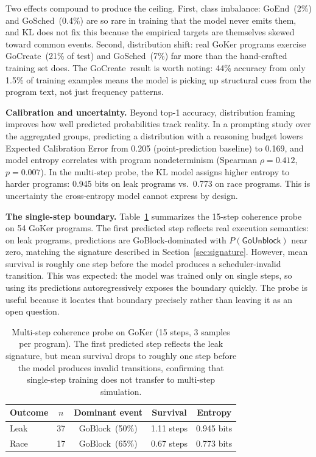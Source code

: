 \documentclass{svproc}
\newcommand{\pblock}{\textsf{GoBlock}}
\newcommand{\punblock}{\textsf{GoUnblock}}
\newcommand{\pcreate}{\textsf{GoCreate}}
\newcommand{\pend}{\textsf{GoEnd}}
\newcommand{\psched}{\textsf{GoSched}}
\begin{document}
Two effects compound to produce the ceiling. First, class imbalance:
\pend\ (2\%) and \psched\ (0.4\%) are so rare in training that the model
never emits them, and KL does not fix this because the empirical targets
are themselves skewed toward common events. Second, distribution shift:
real GoKer programs exercise \pcreate\ (21\% of test) and \psched\ (7\%)
far more than the hand-crafted training set does. The \pcreate\ result
is worth noting: 44\% accuracy from only 1.5\% of training examples
means the model is picking up structural cues from the program text, not
just frequency patterns.

\textbf{Calibration and uncertainty.}
Beyond top-1 accuracy, distribution framing improves how well predicted
probabilities track reality. In a prompting study over the aggregated
groups, predicting a distribution with a reasoning budget lowers Expected
Calibration Error from 0.205 (point-prediction baseline) to 0.169, and
model entropy correlates with program nondeterminism (Spearman
$\rho=0.412$, $p=0.007$). In the multi-step probe, the KL model assigns
higher entropy to harder programs: 0.945 bits on leak programs vs.\
0.773 on race programs. This is uncertainty the cross-entropy model
cannot express by design.

\textbf{The single-step boundary.}
Table~\ref{tab:rollout} summarizes the 15-step coherence probe on 54
GoKer programs. The first predicted step reflects real execution
semantics: on leak programs, predictions are \pblock-dominated with
$P(\punblock)$ near zero, matching the signature described in
Section~\ref{sec:signature}. However, mean survival is roughly one step
before the model produces a scheduler-invalid transition. This was
expected: the model was trained only on single steps, so using its
predictions autoregressively exposes the boundary quickly. The probe is
useful because it locates that boundary precisely rather than leaving it
as an open question.

\begin{table}[t]
\centering
\caption{Multi-step coherence probe on GoKer (15 steps, 3 samples per
program). The first predicted step reflects the leak signature, but
mean survival drops to roughly one step before the model produces
invalid transitions, confirming that single-step training does not
transfer to multi-step simulation.}
\label{tab:rollout}
\small
\begin{tabular}{lcccc}
\toprule
\textbf{Outcome} & \textbf{$n$} & \textbf{Dominant event} & \textbf{Survival} & \textbf{Entropy}\\
\midrule
Leak & 37 & \pblock\ (50\%) & 1.11 steps & 0.945 bits\\
Race & 17 & \pblock\ (65\%) & 0.67 steps & 0.773 bits\\
\bottomrule
\end{tabular}
\end{table}
\end{document}
